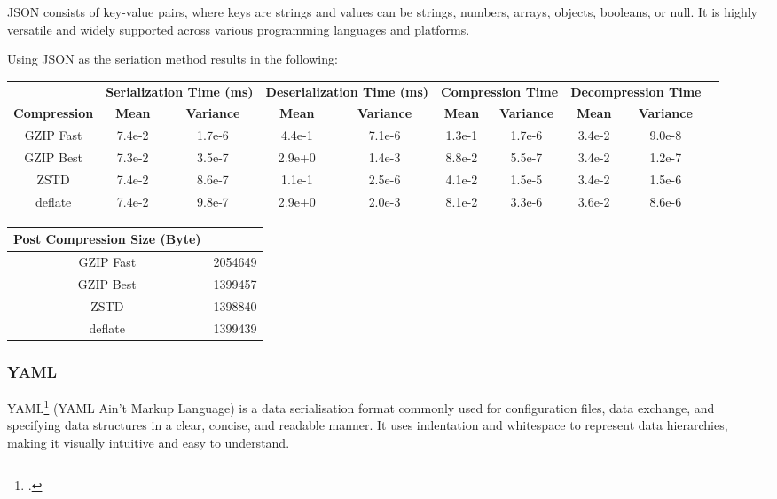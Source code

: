 JSON consists of key-value pairs, where keys are strings and values can be strings, numbers, arrays, objects, booleans, or null. It is highly versatile and widely supported across various programming languages and platforms.

Using JSON as the seriation method results in the following:

\begin{table}[H]
\scriptsize
\centering
\begin{tabular}{cccccccccc}
\hline
 &
  \multicolumn{2}{c}{\textbf{Serialization Time (ms)}} &
  \multicolumn{2}{c}{\textbf{Deserialization Time (ms)}} &
  \multicolumn{2}{c}{\textbf{Compression Time}} &
  \multicolumn{2}{c}{\textbf{Decompression Time}} &
   \\
\textbf{Compression} & \textbf{Mean}     & \textbf{Variance} & \textbf{Mean}     & \textbf{Variance} & \textbf{Mean}     & \textbf{Variance} & \textbf{Mean}     & \textbf{Variance} \\
\hline
GZIP Fast           & 7.4e-2 & 1.7e-6 & 4.4e-1 & 7.1e-6 & 1.3e-1 & 1.7e-6 & 3.4e-2 & 9.0e-8 \\
GZIP Best           & 7.3e-2 & 3.5e-7 & 2.9e+0 & 1.4e-3 & 8.8e-2 & 5.5e-7 & 3.4e-2 & 1.2e-7 \\
ZSTD                & 7.4e-2 & 8.6e-7 & 1.1e-1 & 2.5e-6 & 4.1e-2 & 1.5e-5 & 3.4e-2 & 1.5e-6 \\
deflate             & 7.4e-2 & 9.8e-7 & 2.9e+0 & 2.0e-3 & 8.1e-2 & 3.3e-6 & 3.6e-2 & 8.6e-6 \\
\hline
\end{tabular}
\end{table}

\begin{table}[H]
  \scriptsize
  \centering
  \begin{tabular}{cc}
  \hline
  \textbf{Post Compression Size (Byte)} \\
  \hline
  GZIP Fast           & 2054649 \\
  GZIP Best           & 1399457 \\
  ZSTD                & 1398840 \\
  deflate             & 1399439 \\
  \hline
  \end{tabular}
  \end{table}

\subsubsection{YAML}
YAML\footcite{yaml} (YAML Ain't Markup Language) is a data serialisation format commonly used for configuration files, data exchange, and specifying data structures in a clear, concise, and readable manner. It uses indentation and whitespace to represent data hierarchies, making it visually intuitive and easy to understand.

